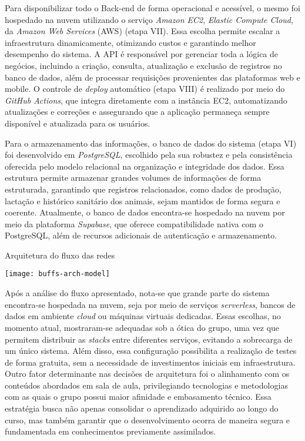 Para disponibilizar todo o Back-end de forma operacional e acessível, o mesmo foi hospedado na nuvem utilizando o serviço \textit{Amazon EC2}, \textit{Elastic Compute Cloud}, da \textit{Amazon Web Services} (AWS) (etapa VII). Essa escolha permite escalar a infraestrutura dinamicamente, otimizando custos e garantindo melhor desempenho do sistema. A API é responsável por gerenciar toda a lógica de negócios, incluindo a criação, consulta, atualização e exclusão de registros no banco de dados, além de processar requisições provenientes das plataformas web e mobile. O controle de \textit{deploy} automático (etapa VIII) é realizado por meio do \textit{GitHub Actions}, que integra diretamente com a instância EC2, automatizando atualizações e correções e assegurando que a aplicação permaneça sempre disponível e atualizada para os usuários.

Para o armazenamento das informações, o banco de dados do sistema (etapa VI) foi desenvolvido em \textit{PostgreSQL}, escolhido pela sua robustez e pela consistência oferecida pelo modelo relacional na organização e integridade dos dados. Essa estrutura permite armazenar grandes volumes de informações de forma estruturada, garantindo que registros relacionados, como dados de produção, lactação e histórico sanitário dos animais, sejam mantidos de forma segura e coerente. Atualmente, o banco de dados encontra-se hospedado na nuvem por meio da plataforma \textit{Supabase}, que oferece compatibilidade nativa com o PostgreSQL, além de recursos adicionais de autenticação e armazenamento.

\begin{flowchart}[!htb]
\centering
\caption{Arquitetura do fluxo das redes}%
\label{fcht:arquitetura}
\texttt{[image: buffs-arch-model]}
\end{flowchart}

Após a análise do fluxo apresentado, nota-se que grande parte do sistema encontra-se hospedada na nuvem, seja por meio de serviços \textit{serverless}, bancos de dados em ambiente \textit{cloud} ou máquinas virtuais dedicadas. Essas escolhas, no momento atual, mostraram-se adequadas sob a ótica do grupo, uma vez que permitem distribuir as \textit{stacks} entre diferentes serviços, evitando a sobrecarga de um único sistema. Além disso, essa configuração possibilita a realização de testes de forma gratuita, sem a necessidade de investimentos iniciais em infraestrutura. Outro fator determinante nas decisões de arquitetura foi o alinhamento com os conteúdos abordados em sala de aula, privilegiando tecnologias e metodologias com as quais o grupo possui maior afinidade e embasamento técnico. Essa estratégia busca não apenas consolidar o aprendizado adquirido ao longo do curso, mas também garantir que o desenvolvimento ocorra de maneira segura e fundamentada em conhecimentos previamente assimilados.
